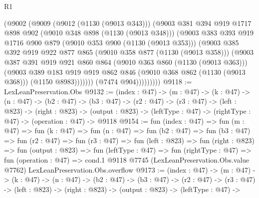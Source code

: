 \begin{lexlean}{R1}
\begin{coremodule}
                  (@9002
                    (@9009
                      (@9012 (@1130 (@9013 @343)))
                      (@9003
                        @381
                        @394
                        @919
                        @1717
                        @898
                        @902
                        (@9010 @348 @898 (@1130 (@9013 @348)))
                        (@9003
                          @383
                          @393
                          @919
                          @1716
                          @900
                          @879
                          (@9010 @353 @900 (@1130 (@9013 @353)))
                          (@9003
                            @385
                            @392
                            @919
                            @922
                            @877
                            @865
                            (@9010 @358 @877 (@1130 (@9013 @358)))
                            (@9003
                              @387
                              @391
                              @919
                              @921
                              @860
                              @864
                              (@9010 @363 @860 (@1130 (@9013 @363)))
                              (@9003
                                @389
                                @183
                                @919
                                @919
                                @862
                                @846
                                (@9010 @368 @862 (@1130 (@9013 @368)))
                                (@1150 @8983)))))))
                    (@7474 @904)))))))))
@9118 := LexLeanPreservation.Obs
@9132 := (index : @47) ->
  (m : @47) ->
  (k : @47) ->
  (n : @47) ->
  (b2 : @47) ->
  (b3 : @47) ->
  (r2 : @47) ->
  (r3 : @47) ->
  (left : @823) ->
  (right : @823) ->
  (output : @823) -> (leftType : @47) -> (rightType : @47) -> (operation : @47) -> @9118
@9154 := fun (index : @47) =>
  fun (m : @47) =>
  fun (k : @47) =>
  fun (n : @47) =>
  fun (b2 : @47) =>
  fun (b3 : @47) =>
  fun (r2 : @47) =>
  fun (r3 : @47) =>
  fun (left : @823) =>
  fun (right : @823) =>
  fun (output : @823) =>
  fun (leftType : @47) =>
  fun (rightType : @47) =>
  fun (operation : @47) =>
  cond.{1} @9118 @7745 (LexLeanPreservation.Obs.value @7762) LexLeanPreservation.Obs.overflow
@9173 := (index : @47) ->
  (m : @47) ->
  (k : @47) ->
  (n : @47) ->
  (b2 : @47) ->
  (b3 : @47) ->
  (r2 : @47) ->
  (r3 : @47) ->
  (left : @823) ->
  (right : @823) ->
  (output : @823) ->
  (leftType : @47) ->

\end{coremodule}
\end{lexlean}
